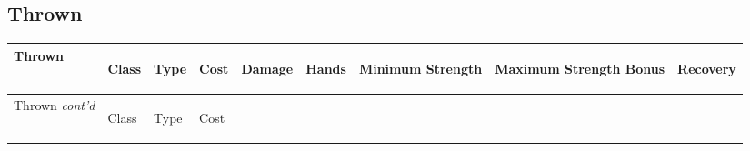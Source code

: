 \documentclass[twoside]{book}
\begin{document}
\hspace{-2ex}

\vspace{1ex}
    
    

\subsection{Thrown}
    
\begin{longtable}{p{1.25in}llllp{2em}p{3em}p{3em}l} 
  Thrown
  &
  \begin{turn}{70}{Class}\end{turn}
          
  &
  \begin{turn}{70}{Type}\end{turn}
          
  &
  \begin{turn}{70}{Cost}\end{turn}
          
  &
  \begin{turn}{70}{Damage}\end{turn}
          
  &
  \begin{turn}{70}{Hands}\end{turn}
          
  &
  \begin{turn}{70}{Minimum Strength}\end{turn}
          
  &
  \begin{turn}{70}{Maximum Strength Bonus}\end{turn}
          
  &
  \begin{turn}{70}{Recovery}\end{turn}
          
  \\
  \hline
  \hline
  \endfirsthead
  Thrown \textit{cont'd}
        
  &
  \begin{turn}{70}{Class}\end{turn}
          
  &
  \begin{turn}{70}{Type}\end{turn}
          
  &
  \begin{turn}{70}{Cost}\end{turn}
          

\end{longtable}
\end{document}
